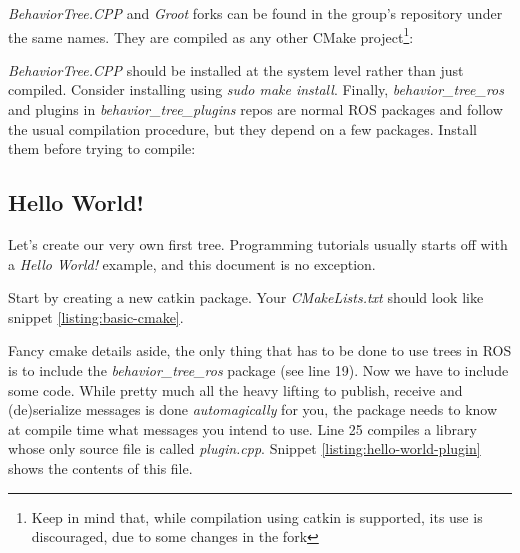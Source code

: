 \documentclass[a4paper,12pt]{article}
\begin{document}
\textit{BehaviorTree.CPP} and \textit{Groot} forks can be found in the group's repository under the same names. They are compiled as any other CMake project\footnote{Keep in mind that, while compilation using catkin is supported, its use is discouraged, due to some changes in the fork}:



\textit{BehaviorTree.CPP} should be installed at the system level rather than just compiled. Consider installing using \textit{sudo make install}. Finally, \textit{behavior_tree_ros} and plugins in \textit{behavior_tree_plugins} repos are normal ROS packages and follow the usual compilation procedure, but they depend on a few packages. Install them before trying to compile:



\clearpage
\subsection{Hello World!}
\label{subsec:hello-world}

Let's create our very own first tree. Programming tutorials usually starts off with a \textit{Hello World!} example, and this document is no exception.

Start by creating a new catkin package. Your \textit{CMakeLists.txt} should look like snippet \ref{listing:basic-cmake}.



Fancy cmake details aside, the only thing that has to be done to use trees in ROS is to include the \textit{behavior_tree_ros} package (see line 19).
Now we have to include some code. While pretty much all the heavy lifting to publish, receive and (de)serialize messages is done \textit{automagically} for you, the package needs to know at compile time what messages you intend to use. Line 25 compiles a library whose only source file is called \textit{plugin.cpp}. Snippet \ref{listing:hello-world-plugin} shows the contents of this file.


\end{document}
